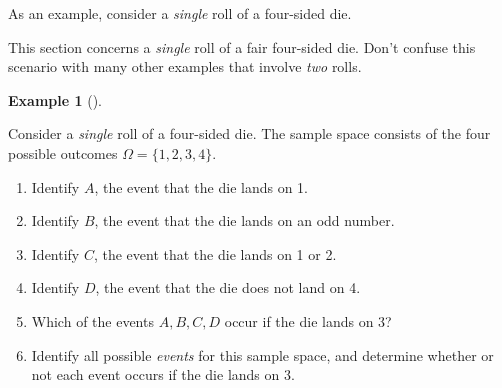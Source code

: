 \documentclass[
  letterpaper,
  DIV=11,
  numbers=noendperiod]{scrreprt}
\providecommand{\tightlist}{%
  \setlength{\itemsep}{0pt}\setlength{\parskip}{0pt}}
\theoremstyle{plain}
\theoremstyle{definition}
\newtheorem{example}{Example}[chapter]
\theoremstyle{definition}
\theoremstyle{definition}
\theoremstyle{remark}
\begin{document}
As an example, consider a \emph{single} roll of a four-sided die.

\begin{tcolorbox}[enhanced jigsaw, opacityback=0, rightrule=.15mm, coltitle=black, colframe=quarto-callout-caution-color-frame, toprule=.15mm, colbacktitle=quarto-callout-caution-color!10!white, opacitybacktitle=0.6, left=2mm, toptitle=1mm, breakable, title={Caution}, bottomtitle=1mm, colback=white, leftrule=.75mm, titlerule=0mm, arc=.35mm, bottomrule=.15mm]

This section concerns a \emph{single} roll of a fair four-sided die.
Don't confuse this scenario with many other examples that involve
\emph{two} rolls.

\end{tcolorbox}

\begin{tcolorbox}[enhanced jigsaw, opacityback=0, left=2mm, colframe=quarto-callout-note-color-frame, toprule=.15mm, breakable, colback=white, leftrule=.75mm, arc=.35mm, rightrule=.15mm, bottomrule=.15mm]

\begin{example}[]\protect\hypertarget{exm-die-sigma-field}{}\label{exm-die-sigma-field}

Consider a \emph{single} roll of a four-sided die. The sample space
consists of the four possible outcomes \(\Omega = \{1, 2, 3, 4\}\).

\begin{enumerate}
\def\labelenumi{\arabic{enumi}.}
\tightlist
\item
  Identify \(A\), the event that the die lands on 1.
\item
  Identify \(B\), the event that the die lands on an odd number.
\item
  Identify \(C\), the event that the die lands on 1 or 2.
\item
  Identify \(D\), the event that the die does not land on 4.
\item
  Which of the events \(A, B, C, D\) occur if the die lands on 3?
\item
  Identify all possible \emph{events} for this sample space, and
  determine whether or not each event occurs if the die lands on 3.
\end{enumerate}

\end{example}

\end{tcolorbox}
\end{document}
